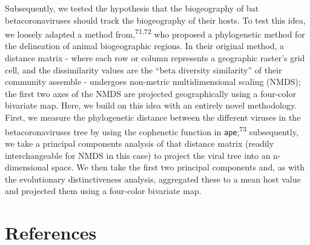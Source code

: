 \documentclass[11pt]{article}
\begin{document}
Subsequently, we tested the hypothesis that the biogeography of bat
betacoronaviruses should track the biogeography of their hosts. To test
this idea, we loosely adapted a method from,\textsuperscript{71,72} who
proposed a phylogenetic method for the delineation of animal
biogeographic regions. In their original method, a distance matrix -
where each row or column represents a geographic raster's grid cell, and
the dissimilarity values are the ``beta diversity similarity'' of their
community assemble - undergoes non-metric multidimensional scaling
(NMDS); the first two axes of the NMDS are projected geographically
using a four-color bivariate map. Here, we build on this idea with an
entirely novel methodology. First, we measure the phylogenetic distance
between the different viruses in the betacoronaviruses tree by using the
cophenetic function in \texttt{ape};\textsuperscript{73} subsequently,
we take a principal components analysis of that distance matrix (readily
interchangeable for NMDS in this case) to project the viral tree into an
n-dimensional space. We then take the first two principal components
and, as with the evolutionary distinctiveness analysis, aggregated these
to a mean host value and projected them using a four-color bivariate
map.

\newpage

\hypertarget{references}{%
\section*{References}\label{references}}
\end{document}
